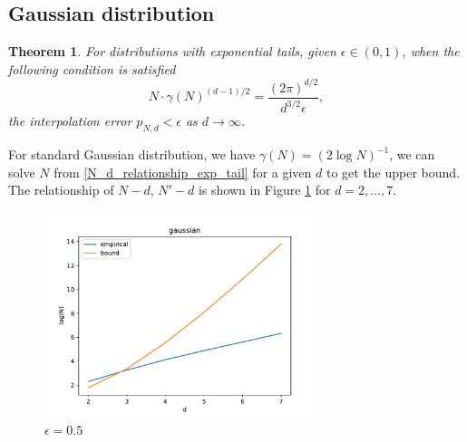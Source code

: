 \documentclass{article}
\newtheorem{theorem}{Theorem}
\begin{document}
\subsection{Gaussian distribution}
\begin{theorem}\label{thm:exp_tails_sample}
    For distributions with exponential tails, given $\epsilon \in (0,1)$, when the following condition is satisfied
    \begin{equation}\label{N_d_relationship_exp_tail}
      N\cdot \gamma(N)^{(d-1)/2} = \frac{(2\pi)^{d/2} }{d^{3/2} \epsilon},
    \end{equation}
    the interpolation error $p_{N,d} < \epsilon$ as $d\to \infty$.
  \end{theorem}
For standard Gaussian distribution, we have $\gamma(N)=(2\log N)^{-1}$,
we can solve $N$ from \eqref{N_d_relationship_exp_tail} for a given $d$ to get the upper bound.
The relationship of $N-d$, $N'-d$ is shown in
Figure \ref{fig:gaussian} for $d=2,\dots, 7$.
\begin{figure}[!ht]
    \centering
    \includegraphics[width=8cm]{gaussian.pdf}
    \caption{$\epsilon=0.5$}\label{fig:gaussian}
\end{figure}
\end{document}

